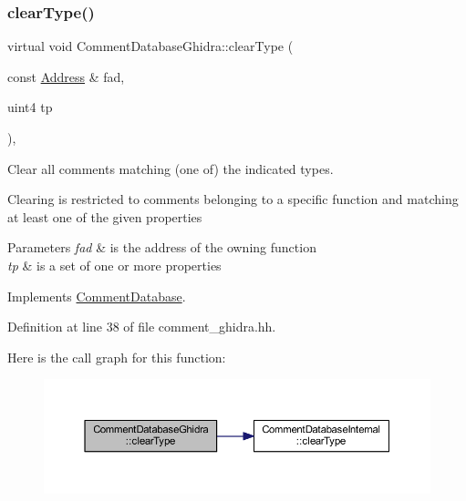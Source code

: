 \subsubsection{\texorpdfstring{clearType()}{clearType()}}
{\footnotesize\ttfamily virtual void Comment\+Database\+Ghidra\+::clear\+Type (\begin{DoxyParamCaption}\item[{const \mbox{\hyperlink{class_address}{Address}} \&}]{fad,  }\item[{uint4}]{tp }\end{DoxyParamCaption})\hspace{0.3cm}{\ttfamily [inline]}, {\ttfamily [virtual]}}



Clear all comments matching (one of) the indicated types. 

Clearing is restricted to comments belonging to a specific function and matching at least one of the given properties 
\begin{DoxyParams}{Parameters}
{\em fad} & is the address of the owning function \\
\hline
{\em tp} & is a set of one or more properties \\
\hline
\end{DoxyParams}


Implements \mbox{\hyperlink{class_comment_database_af4467b35ea8555ddc77e810453051a96}{Comment\+Database}}.



Definition at line 38 of file comment\+\_\+ghidra.\+hh.

Here is the call graph for this function\+:
\nopagebreak
\begin{figure}[H]
\begin{center}
\leavevmode
\includegraphics[width=350pt]{class_comment_database_ghidra_ac5b963863187535cd0c2150bc7df4510_cgraph}
\end{center}
\end{figure}
\mbox{\label{class_comment_database_ghidra_a988787294b6b5657f7b895d0f8ecce92}} 
